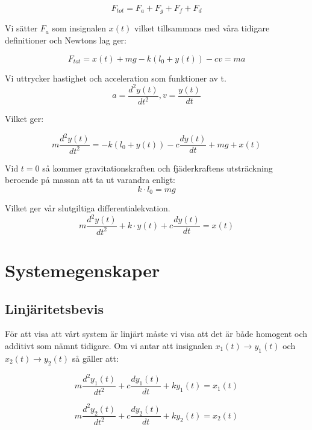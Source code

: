 \documentclass[10pt,a4paper]{article}
\begin{document}
\begin{equation}
F_{tot} = F_a + F_g + F_f + F_d
\end{equation}

Vi sätter $F_a$ som insignalen $x(t)$ vilket tillsammans med våra tidigare definitioner och Newtons lag ger:

\begin{equation}
F_{tot} = x(t) + mg - k(l_0+y(t)) - cv = ma
\end{equation}

Vi uttrycker hastighet och acceleration som funktioner av t.
\begin{equation}
a = \frac{d^2y(t)}{dt^2} , v = \frac{y(t)}{dt}
\end{equation}

Vilket ger:

\begin{equation}
 m\frac{d^2y(t)}{dt^2} =  -k(l_0 + y(t)) -c\frac{dy(t)}{dt} + mg +  x(t)
\end{equation}

Vid $t = 0$ så kommer gravitationskraften och fjäderkraftens utsträckning beroende på massan att ta ut varandra enligt:
\begin{equation}
k \cdot l_0 = mg
\end{equation}

Vilket ger vår slutgiltiga differentialekvation.
\begin{equation}
 m\frac{d^2y(t)}{dt^2} + k \cdot y(t) + c\frac{dy(t)}{dt} = x(t)
\end{equation}


\section{Systemegenskaper}

\subsection{Linjäritetsbevis}

För att visa att vårt system är linjärt måste vi visa att det är både homogent och additivt som nämnt tidigare. Om vi antar att insignalen $x_1(t) \rightarrow y_1(t)$ och $x_2(t) \rightarrow y_2(t)$ så gäller att:

\begin{equation}
m\frac{d^2y_1(t)}{dt^2} + c\frac{dy_1(t)}{dt} + ky_1(t) = x_1(t)
\end{equation}

\begin{equation}
m\frac{d^2y_2(t)}{dt^2} + c\frac{dy_2(t)}{dt} + ky_2(t) = x_2(t)
\end{equation}
\end{document}
